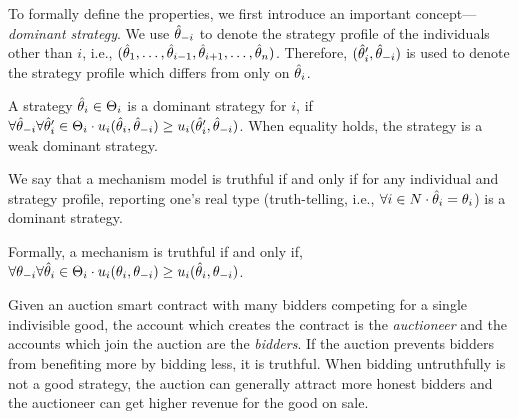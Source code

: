 
To formally define the properties, we first introduce an important concept---\emph{dominant
	strategy}.
We use $\hat{\theta}_{-i}$ to denote the strategy profile of the individuals other than $i$, i.e.,
$(\hat{\theta}_1, \ldots, \hat{\theta}_{i-1},\allowbreak \hat{\theta}_{i+1},\allowbreak \ldots,\allowbreak
\hat{\theta}_n)$.
Therefore, $(\hat{\theta}_i', \hat{\theta}_{-i})$ is used to denote the strategy profile which differs from
\report only on $\hat{\theta}_i$.

\begin{definition}
	A strategy $\hat{\theta}_i \in \Theta_i$ is a dominant strategy for $i$, if $\forall
	\hat{\theta}_{-i} \forall \hat{\theta}_i' \in \Theta_i \cdot u_i(\hat{\theta}_i, \hat{\theta}_{-i}) \geq
	u_i(\hat{\theta}_i', \hat{\theta}_{-i})$.
	When equality holds, the strategy is a weak dominant strategy.
\end{definition}

We say that a mechanism model is truthful if and only if for any individual and strategy profile,
reporting one's real type (truth-telling, i.e., $\forall i \in N \cdot \hat{\theta}_i = \theta_i$) is a
dominant strategy.

\begin{definition}[Truthfulness]\label{def:truthful}
	Formally, a mechanism is truthful if and only if,  $\forall \theta_{-i} \forall \hat{\theta}_i \in
	\Theta_i \cdot u_i(\theta_{i}, \theta_{-i}) \geq u_i(\hat{\theta}_i, \theta_{-i})$.
\end{definition}
%
Given an auction smart contract with many bidders competing for a single indivisible good, the
account which creates the contract is the \emph{auctioneer} and the accounts which join the auction
are the \emph{bidders}.
If the auction prevents bidders from benefiting more by bidding less, it is truthful.
When bidding untruthfully is not a good strategy, the auction can generally attract more honest
bidders and the auctioneer can get higher revenue for the good on sale.


